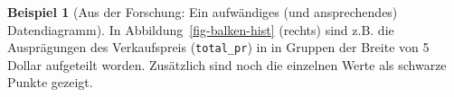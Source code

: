\documentclass[
  a4paper,
]{scrbook}
\theoremstyle{definition}
\newtheorem{example}{Beispiel}[chapter]
\theoremstyle{definition}
\theoremstyle{definition}
\theoremstyle{remark}
\begin{document}
\begin{example}[Aus der Forschung: Ein aufwändiges (und ansprechendes)
Datendiagramm]
In Abbildung~\ref{fig-balken-hist} (rechts) sind z.B. die Ausprägungen
des Verkaufspreis (\texttt{total\_pr}) in in Gruppen der Breite von 5
Dollar aufgeteilt worden. Zusätzlich sind noch die einzelnen Werte als
schwarze Punkte gezeigt.

\begin{figure}

\begin{minipage}{0.50\linewidth}



\end{minipage}%
%
\begin{minipage}{0.50\linewidth}

\end{minipage}
\end{figure}
\end{example}
\end{document}
